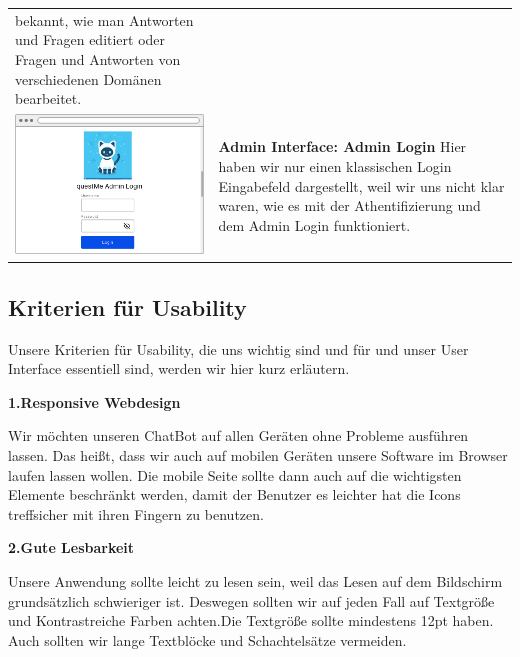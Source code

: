 \begin{tabular}{C{6cm}  L{7cm}}
    bekannt, wie man Antworten und Fragen editiert oder Fragen und Antworten von verschiedenen Domänen bearbeitet.                         \\
    \includegraphics[width=\linewidth]{bilder/old vers. UI Design/Admin Interface.png}    & \textbf{Admin Interface: Admin Login} \newline
    Hier haben wir nur einen klassischen Login Eingabefeld dargestellt, weil wir uns nicht klar waren, wie es mit der Athentifizierung und dem Admin
    Login funktioniert.
\end{tabular}


\subsection{Kriterien für Usability}
Unsere Kriterien für Usability, die uns wichtig sind und für und unser User Interface
essentiell sind, werden wir hier kurz erläutern.
\newline

\noindent\textbf{1.Responsive Webdesign}

\noindent Wir möchten unseren ChatBot auf allen Geräten ohne Probleme ausführen lassen.
Das heißt, dass wir auch auf mobilen Geräten unsere Software im Browser laufen lassen wollen.
Die mobile Seite sollte dann auch auf die wichtigsten Elemente beschränkt werden, damit
der Benutzer es leichter hat die Icons treffsicher mit ihren Fingern zu benutzen.
\newline

\noindent\textbf{2.Gute Lesbarkeit}

\noindent Unsere Anwendung sollte leicht zu lesen sein, weil das Lesen auf dem Bildschirm
grundsätzlich schwieriger ist. Deswegen sollten wir auf jeden Fall
auf Textgröße und Kontrastreiche Farben achten.Die Textgröße sollte mindestens
12pt haben. Auch sollten wir lange Textblöcke und
Schachtelsätze vermeiden.
\newline

